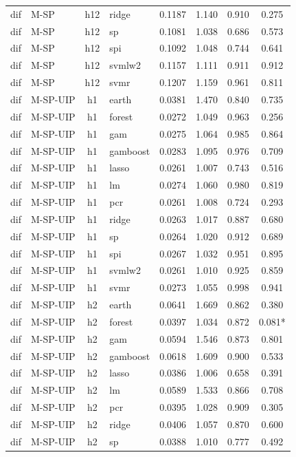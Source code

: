 \begin{ThreePartTable}
\begin{longtable}[t]{llclcccc}
dif & M-SP & h12 & ridge & 0.1187 & 1.140 & 0.910 & 0.275\\
dif & M-SP & h12 & sp & 0.1081 & 1.038 & 0.686 & 0.573\\
dif & M-SP & h12 & spi & 0.1092 & 1.048 & 0.744 & 0.641\\
dif & M-SP & h12 & svmlw2 & 0.1157 & 1.111 & 0.911 & 0.912\\
dif & M-SP & h12 & svmr & 0.1207 & 1.159 & 0.961 & 0.811\\
\addlinespace
dif & M-SP-UIP & h1 & earth & 0.0381 & 1.470 & 0.840 & 0.735\\
dif & M-SP-UIP & h1 & forest & 0.0272 & 1.049 & 0.963 & 0.256\\
dif & M-SP-UIP & h1 & gam & 0.0275 & 1.064 & 0.985 & 0.864\\
dif & M-SP-UIP & h1 & gamboost & 0.0283 & 1.095 & 0.976 & 0.709\\
dif & M-SP-UIP & h1 & lasso & 0.0261 & 1.007 & 0.743 & 0.516\\
dif & M-SP-UIP & h1 & lm & 0.0274 & 1.060 & 0.980 & 0.819\\
dif & M-SP-UIP & h1 & pcr & 0.0261 & 1.008 & 0.724 & 0.293\\
dif & M-SP-UIP & h1 & ridge & 0.0263 & 1.017 & 0.887 & 0.680\\
dif & M-SP-UIP & h1 & sp & 0.0264 & 1.020 & 0.912 & 0.689\\
dif & M-SP-UIP & h1 & spi & 0.0267 & 1.032 & 0.951 & 0.895\\
dif & M-SP-UIP & h1 & svmlw2 & 0.0261 & 1.010 & 0.925 & 0.859\\
dif & M-SP-UIP & h1 & svmr & 0.0273 & 1.055 & 0.998 & 0.941\\
\addlinespace
dif & M-SP-UIP & h2 & earth & 0.0641 & 1.669 & 0.862 & 0.380\\
dif & M-SP-UIP & h2 & forest & 0.0397 & 1.034 & 0.872 & 0.081*\\
dif & M-SP-UIP & h2 & gam & 0.0594 & 1.546 & 0.873 & 0.801\\
dif & M-SP-UIP & h2 & gamboost & 0.0618 & 1.609 & 0.900 & 0.533\\
dif & M-SP-UIP & h2 & lasso & 0.0386 & 1.006 & 0.658 & 0.391\\
dif & M-SP-UIP & h2 & lm & 0.0589 & 1.533 & 0.866 & 0.708\\
dif & M-SP-UIP & h2 & pcr & 0.0395 & 1.028 & 0.909 & 0.305\\
dif & M-SP-UIP & h2 & ridge & 0.0406 & 1.057 & 0.870 & 0.600\\
dif & M-SP-UIP & h2 & sp & 0.0388 & 1.010 & 0.777 & 0.492\\

\end{longtable}
\end{ThreePartTable}
